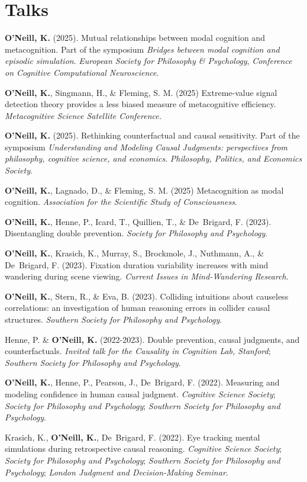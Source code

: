 \section{Talks}
\textbf{O'Neill, K.} (2025). Mutual relationships between modal
cognition and metacognition. Part of the symposium \emph{Bridges
between modal cognition and episodic simulation}. \emph{European
Society for Philosophy \& Psychology}, \emph{Conference on Cognitive
Computational Neuroscience}.

\textbf{O'Neill, K.}, Singmann, H., \& Fleming, S. M. (2025)
Extreme-value signal detection theory provides a less biased measure
of metacognitive efficiency. \emph{Metacognitive Science Satellite
Conference.}

\textbf{O'Neill, K.} (2025). Rethinking counterfactual and causal
sensitivity. Part of the symposium \emph{Understanding and Modeling
Causal Judgments: perspectives from philosophy, cognitive science, and
economics}. \emph{Philosophy, Politics, and Economics Society}.

\textbf{O'Neill, K.}, Lagnado, D., \& Fleming, S. M. (2025)
Metacognition as modal cognition. \emph{Association for the
Scientific Study of Consciousness}.

\textbf{O'Neill, K.}, Henne, P., Icard, T., Quillien, T., \&
De~Brigard, F. (2023). Disentangling double
prevention. \emph{Society for Philosophy and Psychology}.

\textbf{O'Neill, K.}, Krasich, K., Murray, S., Brockmole, J.,
Nuthmann, A., \& De~Brigard, F. (2023). Fixation duration variability
increases with mind wandering during scene viewing. \emph{Current
Issues in Mind-Wandering Research}.

\textbf{O'Neill, K.}, Stern, R., \& Eva, B. (2023). Colliding
intuitions about causeless correlations: an investigation of human
reasoning errors in collider causal structures. \emph{Southern
Society for Philosophy and Psychology}.

Henne, P. \& \textbf{O'Neill, K.} (2022-2023). Double prevention,
causal judgments, and counterfactuals. \emph{Invited talk for the
Causality in Cognition Lab, Stanford}; \emph{Southern Society for
Philosophy and Psychology}.

\textbf{O'Neill, K.}, Henne, P., Pearson, J., De~Brigard,
F. (2022). Measuring and modeling confidence in human causal
judgment. \emph{Cognitive Science Society}; \emph{Society for
Philosophy and Psychology}; \emph{Southern Society for Philosophy and
Psychology}.

Krasich, K., \textbf{O'Neill, K.}, De~Brigard, F. (2022). Eye
tracking mental simulations during retrospective causal
reasoning. \emph{Cognitive Science Society}; \emph{Society for
Philosophy and Psychology}; \emph{Southern Society for Philosophy and
Psychology}; \emph{London Judgment and Decision-Making Seminar}.

